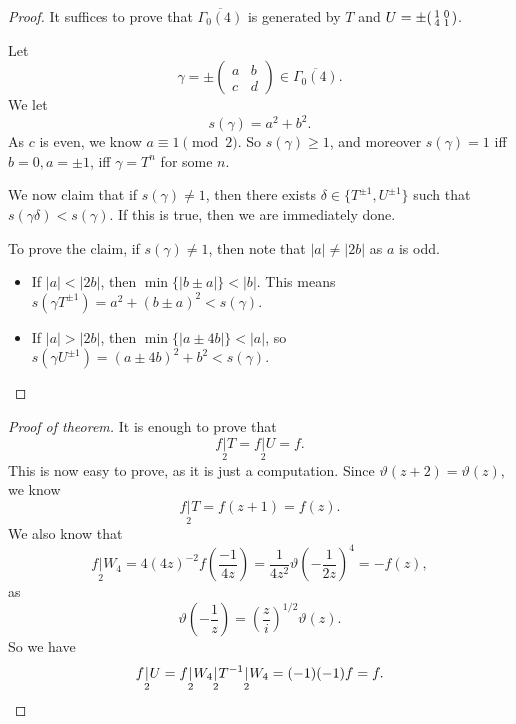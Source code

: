 \documentclass[a4paper]{article}
\begin{document}
\begin{proof}
  It suffices to prove that $\overline{\Gamma_0(4)}$ is generated by $T$ and $U = \pm \begin{psmallmatrix} 1 & 0\\ 4 & 1 \end{psmallmatrix}$.

  Let
  \[
    \gamma = \pm
    \begin{pmatrix}
      a & b\\
      c & d
    \end{pmatrix} \in \overline{\Gamma_0(4)}.
  \]
  We let
  \[
    s(\gamma) = a^2 + b^2.
  \]
  As $c$ is even, we know $a \equiv 1 \pmod 2$. So $s(\gamma) \geq 1$, and moreover $s(\gamma) = 1$ iff $b = 0, a = \pm 1$, iff $\gamma = T^n$ for some $n$.

  We now claim that if $s(\gamma) \not= 1$, then there exists $\delta \in \{T^{\pm 1}, U^{\pm 1}\}$ such that $s(\gamma\delta) < s(\gamma)$. If this is true, then we are immediately done.

  To prove the claim, if $s(\gamma) \not= 1$, then note that $|a| \not= |2b|$ as $a$ is odd.
  \begin{itemize}
    \item If $|a| < |2b|$, then $\min\{|b \pm a|\} < |b|$. This means $s(\gamma T^{\pm 1}) = a^2 + (b \pm a)^2 < s(\gamma)$.
    \item If $|a| > |2b|$, then $\min \{|a \pm 4b|\} < |a|$, so $s(\gamma U^{\pm 1}) = (a \pm 4b)^2 + b^2 < s(\gamma)$.\qedhere
  \end{itemize}
\end{proof}

\begin{proof}[Proof of theorem]
  It is enough to prove that
  \[
    f\underset{2}{|}T = f\underset{2}{|} U = f.
  \]
  This is now easy to prove, as it is just a computation. Since $\vartheta(z + 2) = \vartheta(z)$, we know
  \[
    f\underset{2}{|} T = f(z + 1) = f(z).
  \]
  We also know that
  \[
    f\underset{2}{|} W_4 = 4 (4z)^{-2} f\left(\frac{-1}{4z}\right) = \frac{1}{4 z^2} \vartheta\left(-\frac{1}{2z}\right)^4 = - f(z),
  \]
  as
  \[
    \vartheta\left(-\frac{1}{z}\right) = \left(\frac{z}{i}\right)^{1/2} \vartheta(z).
  \]
  So we have
  \[
    f\underset{2}{|} U = f\underset{2}{|} W_4 \underset{2}{|} T^{-1} \underset{2}{|} W_4 = (-1)(-1)f = f.\qedhere
  \]
\end{proof}
\end{document}
